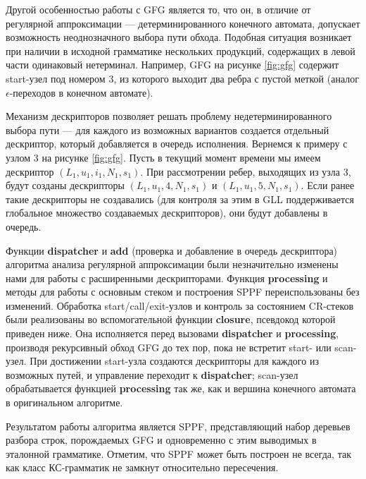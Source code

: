 Другой особенностью работы с GFG является то, что он, в отличие от регулярной аппроксимации --- детерминированного конечного автомата, допускает возможность неоднозначного выбора пути обхода. 
Подобная ситуация возникает при наличии в исходной грамматике нескольких продукций, содержащих в левой части одинаковый нетерминал. 
Например, GFG на рисунке \ref{fig:gfg} содержит start-узел под номером 3, из которого выходит два ребра с пустой меткой (аналог $\epsilon$-переходов в конечном автомате).

Механизм дескрипторов позволяет решать проблему недетерминированного выбора пути --- для каждого из возможных вариантов создается отдельный дескриптор, который добавляется в очередь исполнения. 
Вернемся к примеру с узлом 3 на рисунке \ref{fig:gfg}. Пусть в текущий момент времени мы имеем дескриптор $(L_1, u_1, i_1, N_1, s_1)$. 
При рассмотрении ребер, выходящих из узла 3, будут созданы дескрипторы $(L_1, u_1, 4, N_1, s_1)$ и $(L_1, u_1, 5, N_1, s_1)$. Если ранее такие дескрипторы не создавались (для контроля за этим в GLL поддерживается глобальное множество создаваемых дескрипторов), они будут добавлены в очередь.

Функции \textbf{dispatcher} и \textbf{add} (проверка и добавление в очередь дескриптора) алгоритма анализа регулярной аппроксимации были незначительно изменены нами для работы с расширенными дескрипторами. 
Функция \textbf{processing} и методы для работы с основным стеком и построения SPPF переиспользованы без изменений.
Обработка start/call/exit-узлов и контроль за состоянием CR-стеков были реализованы во вспомогательной функции \textbf{closure}, псевдокод которой приведен ниже.
Она исполняется перед вызовами \textbf{dispatcher} и \textbf{processing}, производя рекурсивный обход GFG до тех пор, пока не встретит start- или scan-узел. 
При достижении start-узла создаются дескрипторы для каждого из возможных путей, и управление переходит к \textbf{dispatcher};
scan-узел обрабатывается функцией \textbf{processing} так же, как и вершина конечного автомата в оригинальном алгоритме.




Результатом работы алгоритма является SPPF, представляющий набор деревьев разбора строк, порождаемых GFG и одновременно с этим выводимых в эталонной грамматике.
Отметим, что SPPF может быть построен не всегда, так как класс КС-грамматик не замкнут относительно пересечения.